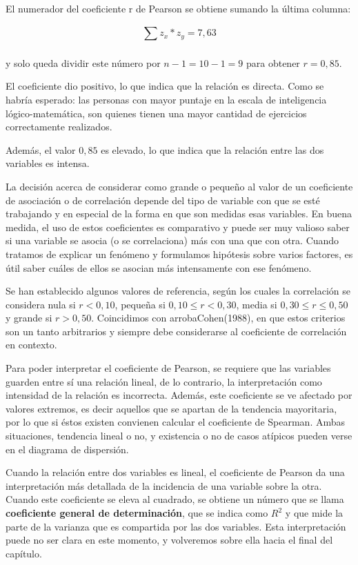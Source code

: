 \documentclass[]{book}
\begin{document}
El numerador del coeficiente r de Pearson se obtiene sumando la última columna:

\[\sum_{}^{}{z_{x}*z_{y} = 7,63}\]

y solo queda dividir este número por \(n-1=10-1=9\) para obtener \(r = 0,85\).

El coeficiente dio positivo, lo que indica que la relación es directa.
Como se habría esperado: las personas con mayor puntaje en la escala de
inteligencia lógico-matemática, son quienes tienen una mayor cantidad de
ejercicios correctamente realizados.

Además, el valor \(0,85\) es elevado, lo que indica que la relación entre
las dos variables es intensa.

La decisión acerca de considerar como grande o pequeño al valor de un
coeficiente de asociación o de correlación depende del tipo de variable
con que se esté trabajando y en especial de la forma en que son medidas
esas variables. En buena medida, el uso de estos coeficientes es
comparativo y puede ser muy valioso saber si una variable se asocia (o
se correlaciona) más con una que con otra. Cuando tratamos de explicar
un fenómeno y formulamos hipótesis sobre varios factores, es útil saber
cuáles de ellos se asocian más intensamente con ese fenómeno.

Se han establecido algunos valores de referencia, según los cuales la
correlación se considera nula si \(r < 0,10\), pequeña si
\(0,10 \leq r < 0,30\), media si \(0,30 \leq r \leq 0,50\) y grande si
\(r > 0,50\). Coincidimos con arrobaCohen(1988), en que estos criterios son un
tanto arbitrarios y siempre debe considerarse al coeficiente de
correlación en contexto.

Para poder interpretar el coeficiente de Pearson, se requiere que las
variables guarden entre sí una relación lineal, de lo contrario, la
interpretación como intensidad de la relación es incorrecta. Además,
este coeficiente se ve afectado por valores extremos, es decir aquellos
que se apartan de la tendencia mayoritaria, por lo que si éstos existen
convienen calcular el coeficiente de Spearman. Ambas situaciones,
tendencia lineal o no, y existencia o no de casos atípicos pueden verse
en el diagrama de dispersión.

Cuando la relación entre dos variables es lineal, el coeficiente de
Pearson da una interpretación más detallada de la incidencia de una
variable sobre la otra. Cuando este coeficiente se eleva al cuadrado, se
obtiene un número que se llama \textbf{coeficiente general de determinación},
que se indica como \(R^{2}\) y que mide la parte de la varianza que es
compartida por las dos variables. Esta interpretación puede no ser clara
en este momento, y volveremos sobre ella hacia el final del capítulo.
\end{document}
